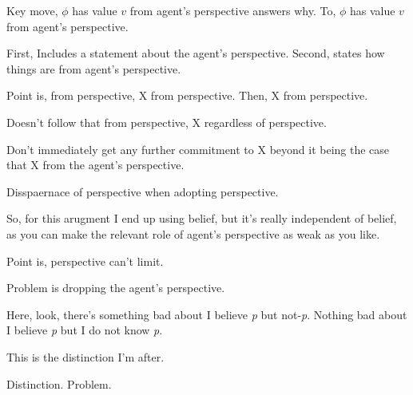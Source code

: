 \begin{note}
  Key move, \(\phi\) has value \(v\) from agent's perspective answers why.
  To, \(\phi\) has value \(v\) from agent's perspective.

  First, Includes a statement about the agent's perspective.
  Second, states how things are from agent's perspective.

  Point is, from perspective, X from perspective.
  Then, X from perspective.

  Doesn't follow that from perspective, X regardless of perspective.

  Don't immediately get any further commitment to X beyond it being the case that X from the agent's perspective.

  Disspaernace of perspective when adopting perspective.

  So, for this arugment I end up using belief, but it's really independent of belief, as you can make the relevant role of agent's perspective as weak as you like.

  Point is, perspective can't limit.

  Problem is dropping the agent's perspective.
\end{note}

\begin{note}
  \citeauthor{Moore:1993wk}
  Here, look, there's something bad about I believe \emph{p} but not-\emph{p}.
  Nothing bad about I believe \emph{p} but I do not know \emph{p}.

  This is the distinction I'm after.
\end{note}

\begin{note}
  Distinction.
  Problem.
\end{note}

